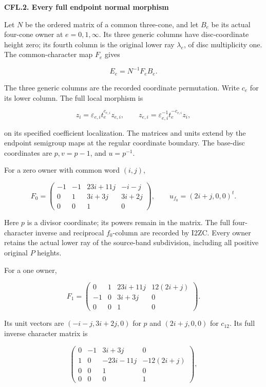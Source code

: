\par

\medskip\noindent\textbf{CFL.2. Every full endpoint normal morphism}

\par\nobreak

Let \(N\) be the ordered matrix of a common three-cone, and let
\(B_e\) be its actual four-cone owner at \(e=0,1,\infty\).
Its three generic columns have disc-coordinate height zero;
its fourth column is the original lower ray \(\lambda_e\),
of disc multiplicity one. The common-character map \(F_e\) gives

\[
                         E_e=N^{-1}F_e B_e.
 \tag{CFL.4}
\]

The three generic columns are the recorded coordinate permutation.
Write \(c_e\) for its lower column. The full local morphism is

\[
 z_i=\varepsilon_{e,i}t_e^{c_{e,i}}z_{e,i},\qquad
 z_{e,i}=\varepsilon_{e,i}^{-1}t_e^{-c_{e,i}}z_i,
 \tag{CFL.5}
\]

on its specified coefficient localization. The matrices and
units extend by the endpoint semigroup maps at the regular
coordinate boundary. The base-disc coordinates are \(p,v=p-1\),
and \(u=p^{-1}\).

For a zero owner with common word \((i,j)\),

\[
 F_0=
 \begin{pmatrix}
 -1&-1&23i+11j&-i-j\\
 0&1&3i+3j&3i+2j\\
 0&0&1&0
 \end{pmatrix},\qquad u_{f_0}=(2i+j,0,0)^t.
 \tag{CFL.6}
\]

Here \(p\) is a divisor coordinate; its powers remain in the
matrix. The full four-character inverse and reciprocal
\(f_0\)-column are recorded by I2ZC. Every owner retains the
actual lower ray of the source-band subdivision, including
all positive original \(P\) heights.

For a one owner,

\[
 F_1=
 \begin{pmatrix}
 0&1&23i+11j&12(2i+j)\\
 -1&0&3i+3j&0\\
 0&0&1&0
 \end{pmatrix}.
 \tag{CFL.7}
\]

Its unit vectors are \((-i-j,3i+2j,0)\) for \(p\) and
\((2i+j,0,0)\) for \(c_{12}\). Its full inverse character
matrix is

\[
 \begin{pmatrix}
 0&-1&3i+3j&0\\
 1&0&-23i-11j&-12(2i+j)\\
 0&0&1&0\\0&0&0&1
 \end{pmatrix},
 \tag{CFL.8}
\]

